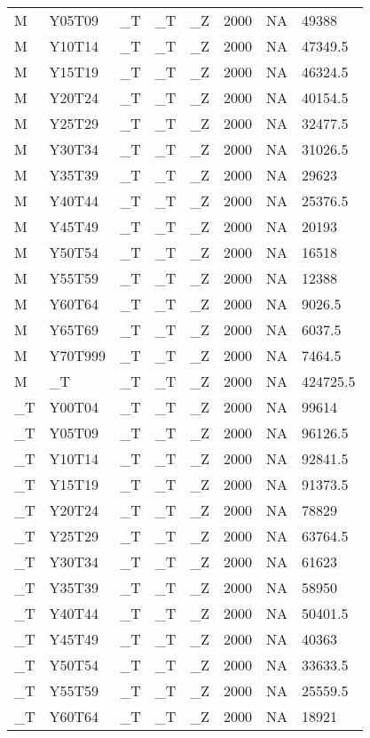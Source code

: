 \begin{longtable}[t]{llllllll}
M & Y05T09 & \_T & \_T & \_Z & 2000 & NA & 49388\\
M & Y10T14 & \_T & \_T & \_Z & 2000 & NA & 47349.5\\
M & Y15T19 & \_T & \_T & \_Z & 2000 & NA & 46324.5\\
\addlinespace
M & Y20T24 & \_T & \_T & \_Z & 2000 & NA & 40154.5\\
M & Y25T29 & \_T & \_T & \_Z & 2000 & NA & 32477.5\\
M & Y30T34 & \_T & \_T & \_Z & 2000 & NA & 31026.5\\
M & Y35T39 & \_T & \_T & \_Z & 2000 & NA & 29623\\
M & Y40T44 & \_T & \_T & \_Z & 2000 & NA & 25376.5\\
\addlinespace
M & Y45T49 & \_T & \_T & \_Z & 2000 & NA & 20193\\
M & Y50T54 & \_T & \_T & \_Z & 2000 & NA & 16518\\
M & Y55T59 & \_T & \_T & \_Z & 2000 & NA & 12388\\
M & Y60T64 & \_T & \_T & \_Z & 2000 & NA & 9026.5\\
M & Y65T69 & \_T & \_T & \_Z & 2000 & NA & 6037.5\\
\addlinespace
M & Y70T999 & \_T & \_T & \_Z & 2000 & NA & 7464.5\\
M & \_T & \_T & \_T & \_Z & 2000 & NA & 424725.5\\
\_T & Y00T04 & \_T & \_T & \_Z & 2000 & NA & 99614\\
\_T & Y05T09 & \_T & \_T & \_Z & 2000 & NA & 96126.5\\
\_T & Y10T14 & \_T & \_T & \_Z & 2000 & NA & 92841.5\\
\addlinespace
\_T & Y15T19 & \_T & \_T & \_Z & 2000 & NA & 91373.5\\
\_T & Y20T24 & \_T & \_T & \_Z & 2000 & NA & 78829\\
\_T & Y25T29 & \_T & \_T & \_Z & 2000 & NA & 63764.5\\
\_T & Y30T34 & \_T & \_T & \_Z & 2000 & NA & 61623\\
\_T & Y35T39 & \_T & \_T & \_Z & 2000 & NA & 58950\\
\addlinespace
\_T & Y40T44 & \_T & \_T & \_Z & 2000 & NA & 50401.5\\
\_T & Y45T49 & \_T & \_T & \_Z & 2000 & NA & 40363\\
\_T & Y50T54 & \_T & \_T & \_Z & 2000 & NA & 33633.5\\
\_T & Y55T59 & \_T & \_T & \_Z & 2000 & NA & 25559.5\\
\_T & Y60T64 & \_T & \_T & \_Z & 2000 & NA & 18921\\

\end{longtable}
